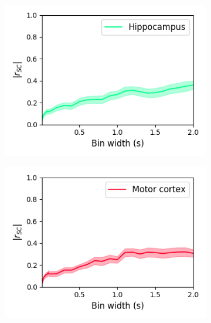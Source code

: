 \documentclass[a4paper,12pt]{article}
\theoremstyle{definition}
\begin{document}
\begin{figure}[p]
  \begin{subfigure}{0.5\textwidth}
    \centering
    \includegraphics[width=\textwidth]{figures/linear_bin_width_correlations_hippocampus_15.png}
  \end{subfigure}
  \begin{subfigure}{0.5\textwidth}
    \centering
    \includegraphics[width=\textwidth]{figures/linear_bin_width_correlations_motor_cortex_15.png}
  \end{subfigure}
  \begin{subfigure}{0.5\textwidth}
    \centering

\end{subfigure}
\end{figure}
\end{document}
